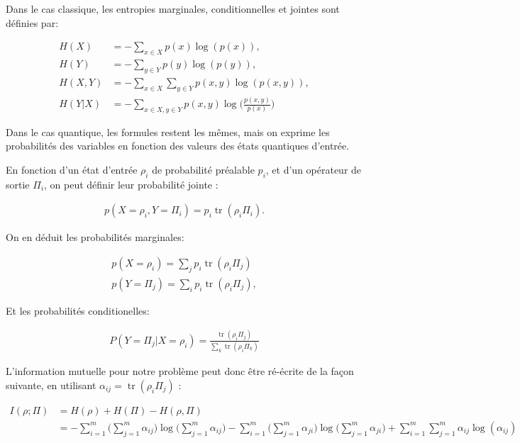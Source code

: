 \documentclass[12pt,a4paper]{article}
\DeclareMathOperator{\tr}{tr}
\begin{document}
    Dans le cas classique, les entropies marginales, conditionnelles et jointes sont définies par: 
    
    \begin{align}
        H(X) &= -\displaystyle \sum_{x \in X} p(x) \log(p(x)) , \\
        H(Y) &= -\displaystyle \sum_{y \in Y} p(y) \log(p(y)) , \\
        H(X, Y) &= -\displaystyle \sum_{x \in X} \displaystyle \sum_{y \in Y} p(x, y) \log(p(x, y)), \\
        H(Y|X) &= -\displaystyle \sum_{x \in X, y \in Y} p(x, y) \log \big(\frac{p(x, y)}{p(x)}\big)
    \end{align}

    Dans le cas quantique, les formules restent les mêmes, mais on exprime les probabilités des variables en fonction des valeurs des états quantiques d'entrée.

    En fonction d'un état d'entrée $\rho_i$ de probabilité préalable $p_i$, et d'un opérateur de sortie $\Pi_i$, on peut définir leur probabilité jointe :

    \begin{align}
        p(X = \rho_i, Y = \Pi_i) = p_i \tr(\rho_i \Pi_i).
    \end{align}

    On en déduit les probabilités marginales:

    \begin{align}
        p(X = \rho_i) = \displaystyle \sum_{j}p_i \tr(\rho_i \Pi_j)  \\
        p(Y = \Pi_j) = \displaystyle \sum_{i}p_i \tr(\rho_i \Pi_j),
    \end{align}

    Et les probabilités conditionelles:

    \begin{align}
        P(Y=\Pi_j | X=\rho_i) = \frac{\tr(\rho_i \Pi_j)}{\displaystyle \sum_{k} \tr(\rho_i \Pi_k)}
    \end{align}

    L'information mutuelle pour notre problème peut donc être ré-écrite de la façon suivante, en utilisant $\alpha_{ij} = \tr(\rho_i \Pi_j)$ :

    \begin{align}
        \label{eq:mi}
        I(\rho; \Pi) &= H(\rho) + H(\Pi) - H(\rho, \Pi) \nonumber \\
        &= - \displaystyle \sum_{i=1}^{m} \big(\displaystyle \sum_{j=1}^{m} \alpha_{ij} \big) \log \big( \displaystyle \sum_{j=1}^{m} \alpha_{ij} \big) - \displaystyle \sum_{i=1}^{m} \big(\displaystyle \sum_{j=1}^{m} \alpha_{ji} \big) \log \big( \displaystyle \sum_{j=1}^{m} \alpha_{ji}\big) + \displaystyle \sum_{i=1}^{m} \displaystyle \sum_{j=1}^{m} \alpha_{ij} \log( \alpha_{ij} )
    \end{align}
\end{document}

